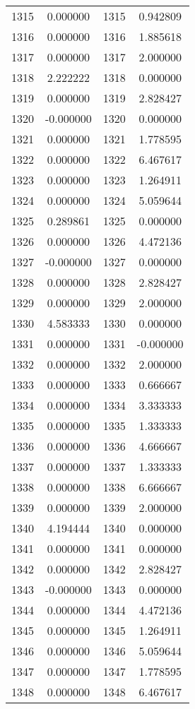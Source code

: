 \documentclass[12pt]{article}
\begin{document}
\begin{longtable}{@{}cccc@{}}
1315 & 0.000000 & 1315 & 0.942809 \\
1316 & 0.000000 & 1316 & 1.885618 \\
1317 & 0.000000 & 1317 & 2.000000 \\
1318 & 2.222222 & 1318 & 0.000000 \\
1319 & 0.000000 & 1319 & 2.828427 \\
1320 & -0.000000 & 1320 & 0.000000 \\
1321 & 0.000000 & 1321 & 1.778595 \\
1322 & 0.000000 & 1322 & 6.467617 \\
1323 & 0.000000 & 1323 & 1.264911 \\
1324 & 0.000000 & 1324 & 5.059644 \\
1325 & 0.289861 & 1325 & 0.000000 \\
1326 & 0.000000 & 1326 & 4.472136 \\
1327 & -0.000000 & 1327 & 0.000000 \\
1328 & 0.000000 & 1328 & 2.828427 \\
1329 & 0.000000 & 1329 & 2.000000 \\
1330 & 4.583333 & 1330 & 0.000000 \\
1331 & 0.000000 & 1331 & -0.000000 \\
1332 & 0.000000 & 1332 & 2.000000 \\
1333 & 0.000000 & 1333 & 0.666667 \\
1334 & 0.000000 & 1334 & 3.333333 \\
1335 & 0.000000 & 1335 & 1.333333 \\
1336 & 0.000000 & 1336 & 4.666667 \\
1337 & 0.000000 & 1337 & 1.333333 \\
1338 & 0.000000 & 1338 & 6.666667 \\
1339 & 0.000000 & 1339 & 2.000000 \\
1340 & 4.194444 & 1340 & 0.000000 \\
1341 & 0.000000 & 1341 & 0.000000 \\
1342 & 0.000000 & 1342 & 2.828427 \\
1343 & -0.000000 & 1343 & 0.000000 \\
1344 & 0.000000 & 1344 & 4.472136 \\
1345 & 0.000000 & 1345 & 1.264911 \\
1346 & 0.000000 & 1346 & 5.059644 \\
1347 & 0.000000 & 1347 & 1.778595 \\
1348 & 0.000000 & 1348 & 6.467617 \\

\end{longtable}
\end{document}
